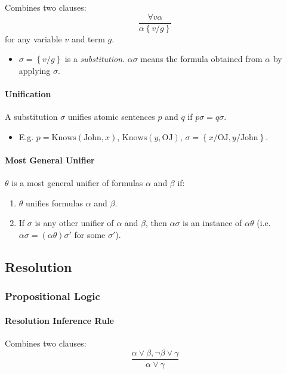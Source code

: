 \documentclass[twocolumn,english]{article}
\begin{document}
Combines two clauses:
\[
\dfrac{\forall v\alpha}{\alpha\left\{ v/g\right\} }
\]
for any variable $v$ and term $g$.
\begin{itemize}
\item $\sigma=\left\{ v/g\right\} $ is a \emph{substitution}. $\alpha\sigma$
means the formula obtained from $\alpha$ by applying $\sigma$.
\end{itemize}

\paragraph{Unification}

A substitution $\sigma$ unifies atomic sentences $p$ and $q$ if
$p\sigma=q\sigma$.
\begin{itemize}
\item E.g. $p=\text{Knows}\left(\text{John},x\right)$, $\text{Knows}\left(y,\text{OJ}\right)$,
$\sigma=\left\{ x/\text{OJ},y/\text{John}\right\} $.
\end{itemize}

\paragraph{Most General Unifier}

$\theta$ is a most general unifier of formulas $\alpha$ and $\beta$
if:
\begin{enumerate}
\item $\theta$ unifies formulas $\alpha$ and $\beta$.
\item If $\sigma$ is any other unifier of $\alpha$ and $\beta$, then
$\alpha\sigma$ is an instance of $\alpha\theta$ (i.e. $\alpha\sigma=\left(\alpha\theta\right)\sigma'$
for some $\sigma'$).
\end{enumerate}

\subsection{Resolution}

\subsubsection{Propositional Logic}

\paragraph{Resolution Inference Rule}

Combines two clauses:
\[
\dfrac{\alpha\lor\beta,\lnot\beta\lor\gamma}{\alpha\lor\gamma}
\]
\end{document}
